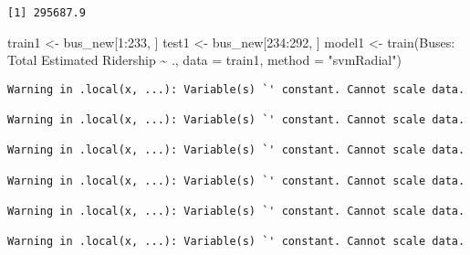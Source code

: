 \documentclass[
  letterpaper,
  DIV=11,
  numbers=noendperiod]{scrartcl}
\newenvironment{Shaded}{\begin{snugshade}}{\end{snugshade}}
\newcommand{\AttributeTok}[1]{\textcolor[rgb]{0.40,0.45,0.13}{#1}}
\newcommand{\DecValTok}[1]{\textcolor[rgb]{0.68,0.00,0.00}{#1}}
\newcommand{\FunctionTok}[1]{\textcolor[rgb]{0.28,0.35,0.67}{#1}}
\newcommand{\NormalTok}[1]{\textcolor[rgb]{0.00,0.23,0.31}{#1}}
\newcommand{\OtherTok}[1]{\textcolor[rgb]{0.00,0.23,0.31}{#1}}
\newcommand{\SpecialCharTok}[1]{\textcolor[rgb]{0.37,0.37,0.37}{#1}}
\newcommand{\StringTok}[1]{\textcolor[rgb]{0.13,0.47,0.30}{#1}}
\begin{document}
\begin{Shaded}
\end{Shaded}

\begin{verbatim}
[1] 295687.9
\end{verbatim}

\begin{Shaded}
\begin{Highlighting}[]
\NormalTok{train1 }\OtherTok{\textless{}{-}}\NormalTok{ bus\_new[}\DecValTok{1}\SpecialCharTok{:}\DecValTok{233}\NormalTok{, ]}
\NormalTok{test1 }\OtherTok{\textless{}{-}}\NormalTok{ bus\_new[}\DecValTok{234}\SpecialCharTok{:}\DecValTok{292}\NormalTok{, ]}
\NormalTok{model1 }\OtherTok{\textless{}{-}} \FunctionTok{train}\NormalTok{(}\StringTok{\textasciigrave{}}\AttributeTok{Buses: Total Estimated Ridership}\StringTok{\textasciigrave{}} \SpecialCharTok{\textasciitilde{}}\NormalTok{ ., }\AttributeTok{data =}\NormalTok{ train1, }\AttributeTok{method =} \StringTok{"svmRadial"}\NormalTok{)}
\end{Highlighting}
\end{Shaded}

\begin{verbatim}
Warning in .local(x, ...): Variable(s) `' constant. Cannot scale data.

Warning in .local(x, ...): Variable(s) `' constant. Cannot scale data.

Warning in .local(x, ...): Variable(s) `' constant. Cannot scale data.

Warning in .local(x, ...): Variable(s) `' constant. Cannot scale data.

Warning in .local(x, ...): Variable(s) `' constant. Cannot scale data.

Warning in .local(x, ...): Variable(s) `' constant. Cannot scale data.
\end{verbatim}
\end{document}
